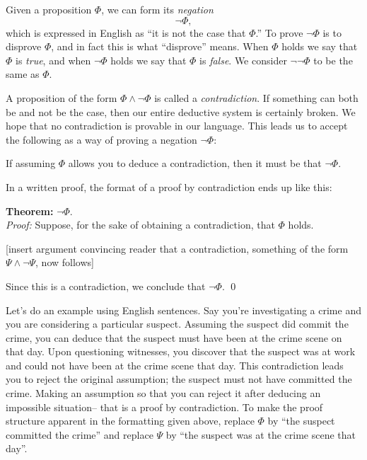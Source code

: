 \documentclass[12pt]{article}
\newcommand{\AND}{\wedge}
\newcommand{\indented}[1]{\begin{adjustwidth}{1em}{}#1\end{adjustwidth}}
\newcommand{\THM}[2]{\textbf{Theorem:} #1\\[0.5em]\textit{Proof:} #2\qed}
\newcommand{\RULE}[2]{\begin{tcolorbox}[title=Rule: #1,colbacktitle=white,coltitle=black,colback=white]#2\end{tcolorbox}}
\def\pA{\Phi}
\def\pB{\Psi}
\begin{document}

Given a proposition $\pA$, we can form its \emph{negation}
$$
\neg \pA,
$$
which is expressed in English as ``it is not the case that $\pA$.''
To prove $\neg\pA$ is to disprove $\pA$, and in fact this is what ``disprove'' means.
When $\pA$ holds we say that $\pA$ is \emph{true}, and when $\neg\pA$ holds we say that $\pA$ is \emph{false}.
We consider $\neg\neg\pA$ to be the same as $\pA$.

A proposition of the form $\pA\AND\neg\pA$ is called a \emph{contradiction}.
If something can both be and not be the case, then our entire deductive system is certainly broken.
We hope that no contradiction is provable in our language.
This leads us to accept the following as a way of proving a negation $\neg\pA$:
\RULE{Proof by contradiction}{
If assuming $\pA$ allows you to deduce a contradiction, then it must be that $\neg\pA$.
}
In a written proof, the format of a proof by contradiction ends up like this:

\THM{$\neg\pA$.}{
Suppose, for the sake of obtaining a contradiction, that $\pA$ holds.
\indented{[insert argument convincing reader that a contradiction, something of the form $\pB\AND\neg\pB$, now follows]}
Since this is a contradiction, we conclude that $\neg\pA$.
}

Let's do an example using English sentences.
Say you're investigating a crime and you are considering a particular suspect.
Assuming the suspect did commit the crime, you can deduce that the suspect must have been at the crime scene on that day.
Upon questioning witnesses, you discover that the suspect was at work and could not have been at the crime scene that day.
This contradiction leads you to reject the original assumption; the suspect must not have committed the crime.
Making an assumption so that you can reject it after deducing an impossible situation-- that is a proof by contradiction.
To make the proof structure apparent in
the formatting given above, replace
$\pA$ by ``the suspect committed the crime'' and replace $\pB$ by ``the suspect was at the crime scene that day''.
\end{document}
